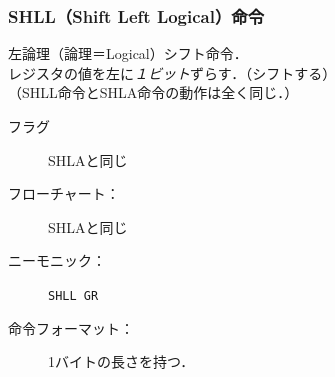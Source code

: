 \documentclass{beamer}                 %
\begin{document}
\begin{frame}
  \frametitle{SHLL（Shift Left Logical）命令}
  左論理（論理＝Logical）シフト命令．\\
  レジスタの値を左に\emph{１ビット}ずらす．（シフトする）\\
  （SHLL命令とSHLA命令の動作は全く同じ．）
  \vfill
  \begin{description}
  \item[フラグ] SHLAと同じ
    \vfill
  \item[フローチャート：] SHLAと同じ
    \vfill
  \item[ニーモニック：] \texttt{SHLL GR}
    \vfill
  \item[命令フォーマット：] 1バイトの長さを持つ．\\
  \end{description}
  \vfill
\end{frame}
\end{document}

